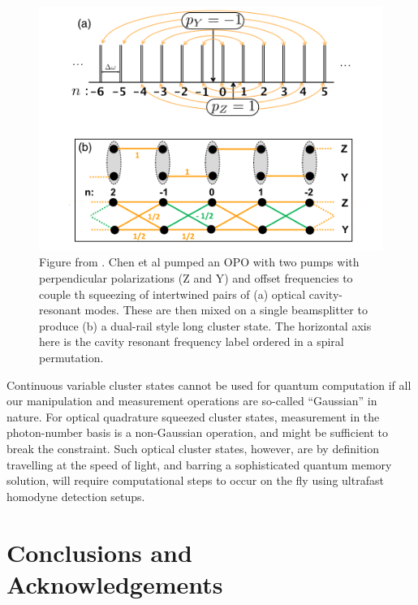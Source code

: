 \documentclass[twocolumn]{Styles/IEEEtran11}
\begin{document}
\begin{figure}[htb]
  \centering
  \includegraphics[width=\linewidth]{Images/squeezed02.png}
  \caption{Figure from \protect\cite{pfister2014}. Chen et al pumped an OPO with two pumps with perpendicular polarizations (Z and Y) and offset frequencies to couple th squeezing of intertwined pairs of (a) optical cavity-resonant modes. These are then mixed on a single beamsplitter to produce (b) a dual-rail style long cluster state. The horizontal axis here is the cavity resonant frequency label ordered in a spiral permutation.}
  \label{squeezedfig2}
\end{figure}

Continuous variable cluster states cannot be used for quantum computation if all our manipulation and measurement operations are so-called ``Gaussian'' in nature. For optical quadrature squeezed cluster states, measurement in the photon-number basis is a non-Gaussian operation, and might be sufficient to break the constraint. Such optical cluster states, however, are by definition travelling at the speed of light, and barring a sophisticated quantum memory solution, will require computational steps to occur on the fly using ultrafast homodyne detection setups.

\section{Conclusions and Acknowledgements}



\end{document}
